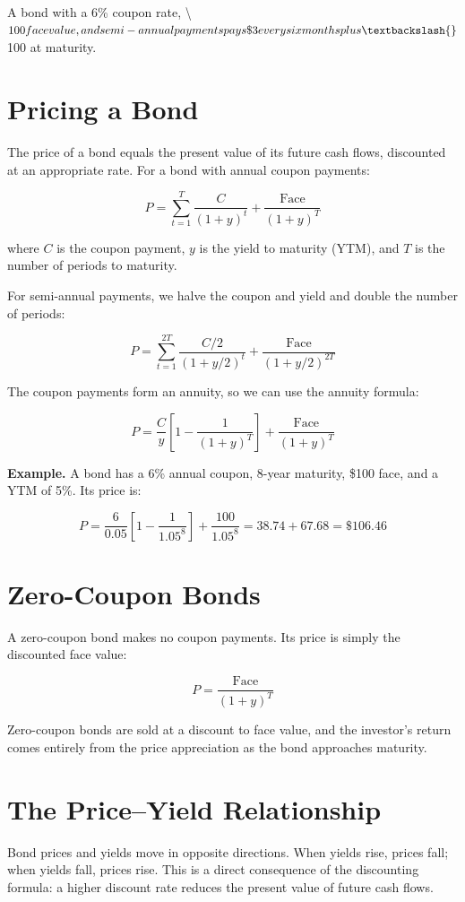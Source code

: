 \documentclass[11pt,letterpaper]{report}
\begin{document}
A bond with a 6\% coupon rate, \textbackslash{}$100 face value, and semi-annual payments pays \$3 every six months plus \textbackslash{}$100 at maturity.

\section{Pricing a Bond}


The price of a bond equals the present value of its future cash flows, discounted at an appropriate rate.  For a bond with annual coupon payments:

$$P = \sum_{t=1}^{T} \frac{C}{(1+y)^t} + \frac{\text{Face}}{(1+y)^T}$$

where $C$ is the coupon payment, $y$ is the yield to maturity (YTM), and $T$ is the number of periods to maturity.

For semi-annual payments, we halve the coupon and yield and double the number of periods:

$$P = \sum_{t=1}^{2T} \frac{C/2}{(1+y/2)^t} + \frac{\text{Face}}{(1+y/2)^{2T}}$$

The coupon payments form an annuity, so we can use the annuity formula:

$$P = \frac{C}{y}\left[1 - \frac{1}{(1+y)^T}\right] + \frac{\text{Face}}{(1+y)^T}$$

\textbf{Example.}  A bond has a 6\% annual coupon, 8-year maturity, \$100 face, and a YTM of 5\%.  Its price is:

$$P = \frac{6}{0.05}\left[1 - \frac{1}{1.05^8}\right] + \frac{100}{1.05^8} = 38.74 + 67.68 = \$106.46$$

\section{Zero-Coupon Bonds}


A zero-coupon bond makes no coupon payments.  Its price is simply the discounted face value:

$$P = \frac{\text{Face}}{(1+y)^T}$$

Zero-coupon bonds are sold at a discount to face value, and the investor's return comes entirely from the price appreciation as the bond approaches maturity.

\section{The Price--Yield Relationship}


Bond prices and yields move in opposite directions.  When yields rise, prices fall; when yields fall, prices rise.  This is a direct consequence of the discounting formula: a higher discount rate reduces the present value of future cash flows.
\end{document}
